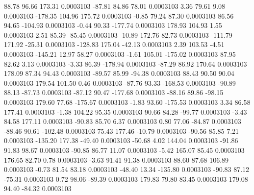        88.78       96.66      173.31     0.0003103
      -87.81       84.86       78.01     0.0003103
        3.36       79.61        9.08     0.0003103
     -178.35      104.96      175.72     0.0003103
       -0.85       79.24       87.30     0.0003103
       86.56       94.65     -104.93     0.0003103
       -0.44       90.33     -177.74     0.0003103
      178.93      104.93        1.55     0.0003103
        2.51       85.39      -85.45     0.0003103
      -10.89      172.76       82.73     0.0003103
     -111.79      171.92      -25.31     0.0003103
     -128.83      175.04      -42.13     0.0003103
        2.39      103.53       -4.51     0.0003103
     -145.21       12.97       58.27     0.0003103
       -1.61      105.01     -175.02     0.0003103
       87.95       82.62        3.13     0.0003103
       -3.33       86.39     -178.94     0.0003103
      -87.29       86.92      170.64     0.0003103
      178.09       87.34       94.43     0.0003103
      -89.57       85.99      -94.38     0.0003103
       88.43       90.50       90.04     0.0003103
      179.54      101.50        0.46     0.0003103
      -87.76       93.33     -168.53     0.0003103
      -90.89       88.13      -87.73     0.0003103
      -87.12       90.47     -177.68     0.0003103
      -88.16       89.86      -98.15     0.0003103
      179.60       77.68     -175.67     0.0003103
       -1.83       93.60     -175.53     0.0003103
        3.34       86.58      177.41     0.0003103
       -1.38      104.22       95.35     0.0003103
       90.66       84.28      -99.77     0.0003103
       -3.43       84.58      177.11     0.0003103
      -90.83       85.70        6.37     0.0003103
        0.80       77.06      -84.87     0.0003103
      -88.46       90.61     -102.48     0.0003103
       75.43      177.46      -10.79     0.0003103
      -90.56       85.85        7.21     0.0003103
     -135.20      177.38      -49.40     0.0003103
      -50.68        4.02      144.04     0.0003103
      -91.86       91.83       98.67     0.0003103
      -90.85       86.77       11.07     0.0003103
       -5.42      165.07       85.45     0.0003103
      176.65       82.70        0.78     0.0003103
       -3.63       91.41       91.38     0.0003103
       88.60       87.68      106.89     0.0003103
       -0.73       81.54       83.18     0.0003103
      -48.40       13.34     -135.80     0.0003103
      -90.83       87.12      -75.31     0.0003103
        0.72       98.06      -89.39     0.0003103
      179.83       79.80       83.45     0.0003103
      179.08       94.40      -84.32     0.0003103
